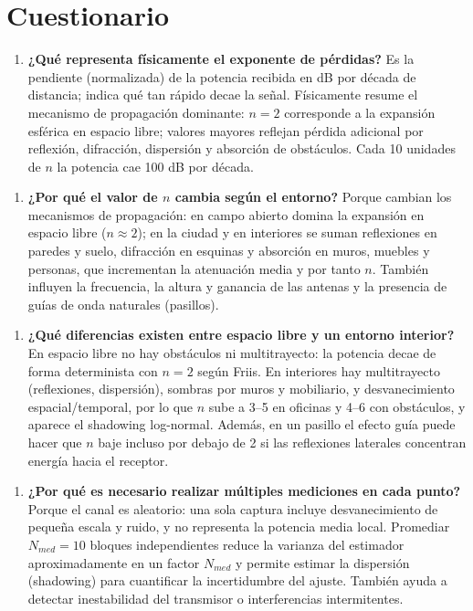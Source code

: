 \documentclass[11pt,a4paper]{article}
\begin{document}
\section{Cuestionario}

\begin{enumerate}
  \item \textbf{¿Qué representa físicamente el exponente de pérdidas?} Es la pendiente (normalizada) de la potencia recibida en dB por década de distancia; indica qué tan rápido decae la señal. Físicamente resume el mecanismo de propagación dominante: $n=2$ corresponde a la expansión esférica en espacio libre; valores mayores reflejan pérdida adicional por reflexión, difracción, dispersión y absorción de obstáculos. Cada 10 unidades de $n$ la potencia cae 100 dB por década.
\end{enumerate}

\begin{enumerate}
  \item \textbf{¿Por qué el valor de $n$ cambia según el entorno?} Porque cambian los mecanismos de propagación: en campo abierto domina la expansión en espacio libre ($n\approx2$); en la ciudad y en interiores se suman reflexiones en paredes y suelo, difracción en esquinas y absorción en muros, muebles y personas, que incrementan la atenuación media y por tanto $n$. También influyen la frecuencia, la altura y ganancia de las antenas y la presencia de guías de onda naturales (pasillos).
\end{enumerate}

\begin{enumerate}
  \item \textbf{¿Qué diferencias existen entre espacio libre y un entorno interior?} En espacio libre no hay obstáculos ni multitrayecto: la potencia decae de forma determinista con $n=2$ según Friis. En interiores hay multitrayecto (reflexiones, dispersión), sombras por muros y mobiliario, y desvanecimiento espacial/temporal, por lo que $n$ sube a 3--5 en oficinas y 4--6 con obstáculos, y aparece el shadowing log-normal. Además, en un pasillo el efecto guía puede hacer que $n$ baje incluso por debajo de 2 si las reflexiones laterales concentran energía hacia el receptor.
\end{enumerate}

\begin{enumerate}
  \item \textbf{¿Por qué es necesario realizar múltiples mediciones en cada punto?} Porque el canal es aleatorio: una sola captura incluye desvanecimiento de pequeña escala y ruido, y no representa la potencia media local. Promediar $N_{med}=10$ bloques independientes reduce la varianza del estimador aproximadamente en un factor $N_{med}$ y permite estimar la dispersión (shadowing) para cuantificar la incertidumbre del ajuste. También ayuda a detectar inestabilidad del transmisor o interferencias intermitentes.
\end{enumerate}
\end{document}
